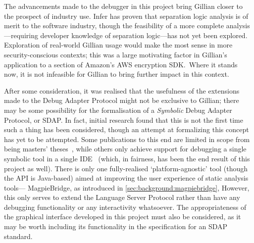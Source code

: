 The advancements made to the debugger in this project bring Gillian closer
to the prospect of industry use. Infer has proven that separation logic analysis
is of merit to the software industry, though the feasibility of a more complete
analysis---requiring developer knowledge of separation logic---has not yet
been explored. Exploration of real-world Gillian usage would make the most sense
in more security-conscious contexts; this was a large motivating factor in
Gillian's application to a section of Amazon's AWS encryption SDK.\ Where it
stands now, it is not infeasible for Gillian to bring further impact in this
context.

After some consideration, it was realised that the usefulness of the extensions
made to the Debug Adapter Protocol might not be exclusive to Gillian; there may
be some possibility for the formalisation of a \textit{Symbolic} Debug Adapter
Protocol, or SDAP. In fact, initial research found that this is not the first
time such a thing has been considered, though an attempt at formalizing this
concept has yet to be attempted. Some publications to this end are limited in
scope from being masters' theses~\cite{sdap-aurecchia}, while others only
achieve support for debugging a single symbolic tool in a single
IDE~\cite{sdap-colombo, sdap-kps} (which, in fairness, has been the end result
of this project as well).
There is only one fully-realised `platform-agnostic' tool (though the API is
Java-based) aimed at improving the user experience of static analysis tools---%
MagpieBridge, as introduced in \autoref{sec:background:magpiebridge}, However,
this only serves to extend the Language Server Protocol rather than have any
debugging functionality or any interactivity whatsoever. The appropriateness of
the graphical interface developed in this project must also be considered, as it
may be worth including its functionality in the specification for an SDAP
standard.
